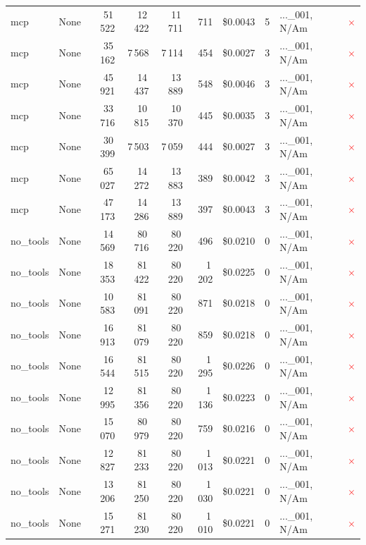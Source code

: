 \documentclass[a4paper,11pt]{article}
\begin{document}
\begin{table}[H]
{\begin{tabular}{l r r r r r r r l c}
mcp & None & 51\,522 & 12\,422 & 11\,711 & 711 & \$0.0043 & 5 & ...\_001, N/Am & \textcolor{red}{\(\times\)} \\
mcp & None & 35\,162 & 7\,568 & 7\,114 & 454 & \$0.0027 & 3 & ...\_001, N/Am & \textcolor{red}{\(\times\)} \\
mcp & None & 45\,921 & 14\,437 & 13\,889 & 548 & \$0.0046 & 3 & ...\_001, N/Am & \textcolor{red}{\(\times\)} \\
mcp & None & 33\,716 & 10\,815 & 10\,370 & 445 & \$0.0035 & 3 & ...\_001, N/Am & \textcolor{red}{\(\times\)} \\
mcp & None & 30\,399 & 7\,503 & 7\,059 & 444 & \$0.0027 & 3 & ...\_001, N/Am & \textcolor{red}{\(\times\)} \\
mcp & None & 65\,027 & 14\,272 & 13\,883 & 389 & \$0.0042 & 3 & ...\_001, N/Am & \textcolor{red}{\(\times\)} \\
mcp & None & 47\,173 & 14\,286 & 13\,889 & 397 & \$0.0043 & 3 & ...\_001, N/Am & \textcolor{red}{\(\times\)} \\
\midrule
no\_tools & None & 14\,569 & 80\,716 & 80\,220 & 496 & \$0.0210 & 0 & ...\_001, N/Am & \textcolor{red}{\(\times\)} \\
no\_tools & None & 18\,353 & 81\,422 & 80\,220 & 1\,202 & \$0.0225 & 0 & ...\_001, N/Am & \textcolor{red}{\(\times\)} \\
no\_tools & None & 10\,583 & 81\,091 & 80\,220 & 871 & \$0.0218 & 0 & ...\_001, N/Am & \textcolor{red}{\(\times\)} \\
no\_tools & None & 16\,913 & 81\,079 & 80\,220 & 859 & \$0.0218 & 0 & ...\_001, N/Am & \textcolor{red}{\(\times\)} \\
no\_tools & None & 16\,544 & 81\,515 & 80\,220 & 1\,295 & \$0.0226 & 0 & ...\_001, N/Am & \textcolor{red}{\(\times\)} \\
no\_tools & None & 12\,995 & 81\,356 & 80\,220 & 1\,136 & \$0.0223 & 0 & ...\_001, N/Am & \textcolor{red}{\(\times\)} \\
no\_tools & None & 15\,070 & 80\,979 & 80\,220 & 759 & \$0.0216 & 0 & ...\_001, N/Am & \textcolor{red}{\(\times\)} \\
no\_tools & None & 12\,827 & 81\,233 & 80\,220 & 1\,013 & \$0.0221 & 0 & ...\_001, N/Am & \textcolor{red}{\(\times\)} \\
no\_tools & None & 13\,206 & 81\,250 & 80\,220 & 1\,030 & \$0.0221 & 0 & ...\_001, N/Am & \textcolor{red}{\(\times\)} \\
no\_tools & None & 15\,271 & 81\,230 & 80\,220 & 1\,010 & \$0.0221 & 0 & ...\_001, N/Am & \textcolor{red}{\(\times\)} \\

\end{tabular}}
\end{table}
\end{document}
